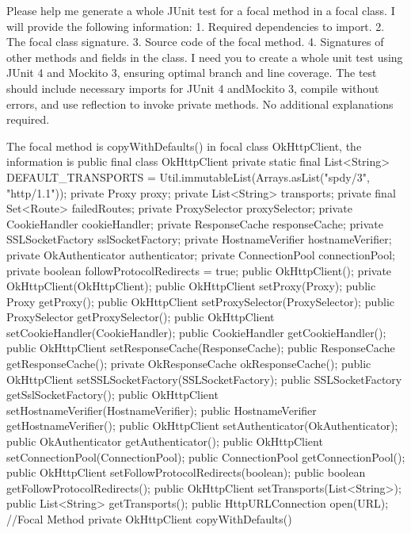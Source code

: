 \begin{prompt}
  Please help me generate a whole JUnit test for a focal method in a focal class. I will provide the following information: 
  1. Required dependencies to import.
  2. The focal class signature.
  3. Source code of the focal method.
  4. Signatures of other methods and fields in the class.
  I need you to create a whole unit test using JUnit 4 and Mockito 3, ensuring optimal branch and line coverage. The test should include necessary imports for JUnit 4 andMockito 3, compile without errors, and use reflection to invoke private methods. No additional explanations required.
  
  The focal method is copyWithDefaults() in focal class OkHttpClient, the information is public final class OkHttpClient {
    private static final List<String> DEFAULT_TRANSPORTS
        = Util.immutableList(Arrays.asList("spdy/3", "http/1.1"));
    private Proxy proxy;
    private List<String> transports;
    private final Set<Route> failedRoutes;
    private ProxySelector proxySelector;
    private CookieHandler cookieHandler;
    private ResponseCache responseCache;
    private SSLSocketFactory sslSocketFactory;
    private HostnameVerifier hostnameVerifier;
    private OkAuthenticator authenticator;
    private ConnectionPool connectionPool;
    private boolean followProtocolRedirects = true;
    public OkHttpClient();
    private OkHttpClient(OkHttpClient);
    public OkHttpClient setProxy(Proxy);
    public Proxy getProxy();
    public OkHttpClient setProxySelector(ProxySelector);
    public ProxySelector getProxySelector();
    public OkHttpClient setCookieHandler(CookieHandler);
    public CookieHandler getCookieHandler();
    public OkHttpClient setResponseCache(ResponseCache);
    public ResponseCache getResponseCache();
    private OkResponseCache okResponseCache();
    public OkHttpClient setSSLSocketFactory(SSLSocketFactory);
    public SSLSocketFactory getSslSocketFactory();
    public OkHttpClient setHostnameVerifier(HostnameVerifier);
    public HostnameVerifier getHostnameVerifier();
    public OkHttpClient setAuthenticator(OkAuthenticator);
    public OkAuthenticator getAuthenticator();
    public OkHttpClient setConnectionPool(ConnectionPool);
    public ConnectionPool getConnectionPool();
    public OkHttpClient setFollowProtocolRedirects(boolean);
    public boolean getFollowProtocolRedirects();
    public OkHttpClient setTransports(List<String>);
    public List<String> getTransports();
    public HttpURLConnection open(URL);
    //Focal Method
    private OkHttpClient copyWithDefaults() {
}}
\end{prompt}
